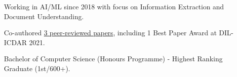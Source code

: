 % 
\begin{zitemize}
    \item Working in AI/ML since 2018 with focus on Information Extraction and Document Understanding.
    \item Co-authored \href{https://scholar.google.com/citations?user=\gscholarid}{3 peer-reviewed papers}, including 1 Best Paper Award at DIL-ICDAR 2021.
    \item Bachelor of Computer Science (Honours Programme) - Highest Ranking Graduate (1st/600+).
\end{zitemize}
